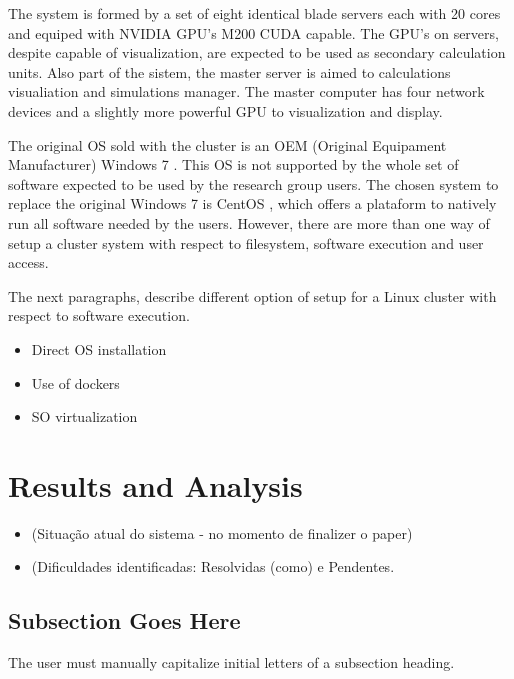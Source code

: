 \documentclass{anstrans}
\begin{document}
The system is formed by a set of eight identical blade servers each with 20 cores and equiped with
NVIDIA GPU's M200 CUDA\cite{CUDA} capable. The GPU's on servers, despite capable of visualization,
are expected to be used as secondary calculation units. Also part of the sistem, the master server is aimed to calculations
visualiation and simulations manager. The master computer has
four network devices and a slightly more powerful GPU to visualization and display.

The original OS sold with the cluster is an OEM (Original Equipament Manufacturer) Windows 7 \cite{windows7}. This
OS is not supported by the whole set of software expected to be used by the research group users. The chosen
system to replace the original Windows 7 is CentOS \cite{centos}, which offers a plataform to natively run all
software needed by the users. However, there are more than one way of setup a cluster system with respect
to filesystem, software execution and user access.

The next paragraphs, describe different option of setup for a Linux cluster with respect to software execution.

\begin{itemize}
\item Direct OS installation
\item Use of dockers
\item SO virtualization
\end{itemize}

\section{Results and Analysis}

\begin{itemize}

\item (Situação atual do sistema - no momento de finalizer o paper)
\item (Dificuldades identificadas: Resolvidas (como) e Pendentes.
  
\end{itemize}

\subsection{Subsection Goes Here}
The user must manually capitalize initial letters of a subsection heading.
\end{document}
